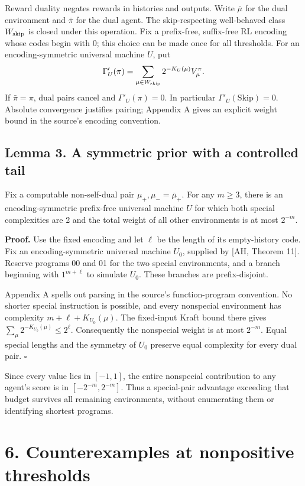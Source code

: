 \documentclass[
  11pt,
  letterpaper,
]{article}
\begin{document}
Reward duality negates rewards in histories and outputs. Write
\(\bar\mu\) for the dual environment and \(\bar\pi\) for the dual agent.
The skip-respecting well-behaved class \(W_{\rm skip}\) is closed under
this operation. Fix a prefix-free, suffix-free RL encoding whose codes
begin with 0; this choice can be made once for all thresholds. For an
encoding-symmetric universal machine \(U\), put \[
       \Gamma'_U(\pi)=
             \sum_{\mu\in W_{\rm skip}}2^{-K_U(\mu)}V_\mu^\pi.
\] If \(\bar\pi=\pi\), dual pairs cancel and \(\Gamma'_U(\pi)=0\). In
particular \(\Gamma'_U(\mathrm{Skip})=0\). Absolute convergence
justifies pairing; Appendix A gives an explicit weight bound in the
source's encoding convention.

\subsection{Lemma 3. A symmetric prior with a controlled
tail}\label{lemma-3.-a-symmetric-prior-with-a-controlled-tail}

Fix a computable non-self-dual pair \(\mu_+,\mu_-=\bar\mu_+\). For any
\(m\geq3\), there is an encoding-symmetric prefix-free universal machine
\(U\) for which both special complexities are 2 and the total weight of
all other environments is at most \(2^{-m}\).

\textbf{Proof.} Use the fixed encoding and let \(\ell\) be the length of
its empty-history code. Fix an encoding-symmetric universal machine
\(U_0\), supplied by {[}AH, Theorem 11{]}. Reserve programs 00 and 01
for the two special environments, and a branch beginning with
\(1^{m+\ell}\) to simulate \(U_0\). These branches are prefix-disjoint.

Appendix A spells out parsing in the source's function-program
convention. No shorter special instruction is possible, and every
nonspecial environment has complexity \(m+\ell+K_{U_0}(\mu)\). The
fixed-input Kraft bound there gives
\(\sum_\mu2^{-K_{U_0}(\mu)}\leq2^\ell\). Consequently the nonspecial
weight is at most \(2^{-m}\). Equal special lengths and the symmetry of
\(U_0\) preserve equal complexity for every dual pair. \hfill\(\square\)

Since every value lies in \([-1,1]\), the entire nonspecial contribution
to any agent's score is in \([-2^{-m},2^{-m}]\). Thus a special-pair
advantage exceeding that budget survives all remaining environments,
without enumerating them or identifying shortest programs.

\section{6. Counterexamples at nonpositive
thresholds}\label{counterexamples-at-nonpositive-thresholds}
\end{document}
